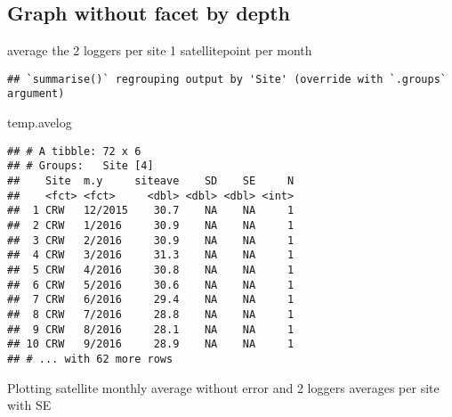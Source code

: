 \documentclass[
]{article}
\newenvironment{Shaded}{\begin{snugshade}}{\end{snugshade}}
\newcommand{\DataTypeTok}[1]{\textcolor[rgb]{0.13,0.29,0.53}{#1}}
\newcommand{\KeywordTok}[1]{\textcolor[rgb]{0.13,0.29,0.53}{\textbf{#1}}}
\newcommand{\NormalTok}[1]{#1}
\newcommand{\OperatorTok}[1]{\textcolor[rgb]{0.81,0.36,0.00}{\textbf{#1}}}
\newcommand{\StringTok}[1]{\textcolor[rgb]{0.31,0.60,0.02}{#1}}
\begin{document}
\hypertarget{graph-without-facet-by-depth}{%
\subsection{Graph without facet by
depth}\label{graph-without-facet-by-depth}}

average the 2 loggers per site 1 satellitepoint per month

\begin{Shaded}
\end{Shaded}

\begin{verbatim}
## `summarise()` regrouping output by 'Site' (override with `.groups` argument)
\end{verbatim}

\begin{Shaded}
\begin{Highlighting}[]
\NormalTok{temp.avelog}
\end{Highlighting}
\end{Shaded}

\begin{verbatim}
## # A tibble: 72 x 6
## # Groups:   Site [4]
##    Site  m.y     siteave    SD    SE     N
##    <fct> <fct>     <dbl> <dbl> <dbl> <int>
##  1 CRW   12/2015    30.7    NA    NA     1
##  2 CRW   1/2016     30.9    NA    NA     1
##  3 CRW   2/2016     30.9    NA    NA     1
##  4 CRW   3/2016     31.3    NA    NA     1
##  5 CRW   4/2016     30.8    NA    NA     1
##  6 CRW   5/2016     30.6    NA    NA     1
##  7 CRW   6/2016     29.4    NA    NA     1
##  8 CRW   7/2016     28.8    NA    NA     1
##  9 CRW   8/2016     28.1    NA    NA     1
## 10 CRW   9/2016     28.9    NA    NA     1
## # ... with 62 more rows
\end{verbatim}

Plotting satellite monthly average without error and 2 loggers averages
per site with SE
\end{document}

